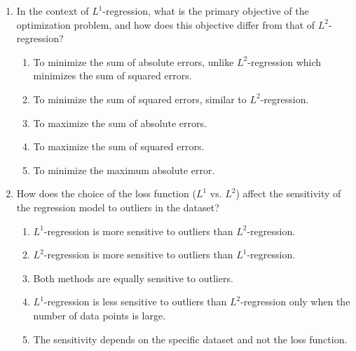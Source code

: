 \documentclass{article}%
\begin{document}
\begin{enumerate}
\begin{enumerate}
\item The $L^1$ loss function is more sensitive to outliers than the $L^2$ loss function because it uses the absolute value of the errors, which gives more weight to large errors compared to the squared errors used in $L^2$ regression.%
\item Both $L^1$ and $L^2$ loss functions are equally sensitive to outliers because they both aim to minimize the difference between the predicted and actual values.%
\item The sensitivity to outliers depends on the specific dataset and not on the choice of the loss function ($L^1$ or $L^2$).%
\item The $L^1$ loss function is only sensitive to outliers when the number of outliers is greater than half the number of data points.%
\end{enumerate}%
\vspace{1em}%
\item In the context of $L^1$-regression, what is the primary objective of the optimization problem, and how does this objective differ from that of $L^2$-regression?%
\begin{enumerate}%
\item To minimize the sum of absolute errors, unlike $L^2$-regression which minimizes the sum of squared errors.%
\item To minimize the sum of squared errors, similar to $L^2$-regression.%
\item To maximize the sum of absolute errors.%
\item To maximize the sum of squared errors.%
\item To minimize the maximum absolute error.%
\end{enumerate}%
\vspace{1em}%
\item How does the choice of the loss function ($L^1$ vs. $L^2$) affect the sensitivity of the regression model to outliers in the dataset?%
\begin{enumerate}%
\item $L^1$-regression is more sensitive to outliers than $L^2$-regression.%
\item $L^2$-regression is more sensitive to outliers than $L^1$-regression.%
\item Both methods are equally sensitive to outliers.%
\item $L^1$-regression is less sensitive to outliers than $L^2$-regression only when the number of data points is large.%
\item The sensitivity depends on the specific dataset and not the loss function.%

\end{enumerate}
\end{enumerate}
\end{document}
